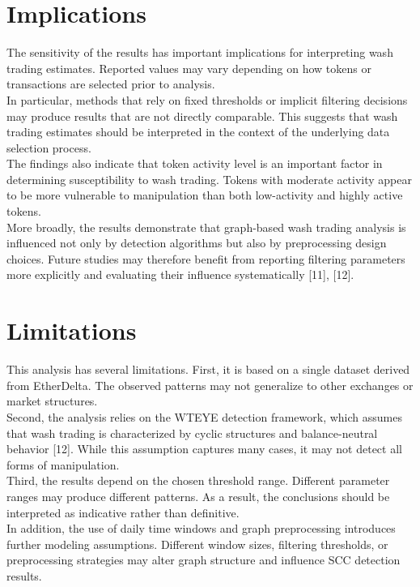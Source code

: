 \documentclass[language=english,thesis=bachelor,nosecondtitle,faculty=cb,onesided,12pt]{hsmw-thesis}
\begin{document}
	\section{Implications}
The sensitivity of the results has important implications for interpreting wash trading estimates. Reported values may vary depending on how tokens or transactions are selected prior to analysis.\\
In particular, methods that rely on fixed thresholds or implicit filtering decisions may produce results that are not directly comparable. This suggests that wash trading estimates should be interpreted in the context of the underlying data selection process.\\
The findings also indicate that token activity level is an important factor in determining susceptibility to wash trading. Tokens with moderate activity appear to be more vulnerable to manipulation than both low-activity and highly active tokens.\\
More broadly, the results demonstrate that graph-based wash trading analysis is influenced not only by detection algorithms but also by preprocessing design choices. Future studies may therefore benefit from reporting filtering parameters more explicitly and evaluating their influence systematically [11], [12].
	\section{Limitations}
This analysis has several limitations. First, it is based on a single dataset derived from EtherDelta. The observed patterns may not generalize to other exchanges or market structures.\\
Second, the analysis relies on the WTEYE detection framework, which assumes that wash trading is characterized by cyclic structures and balance-neutral behavior [12]. While this assumption captures many cases, it may not detect all forms of manipulation.\\
Third, the results depend on the chosen threshold range. Different parameter ranges may produce different patterns. As a result, the conclusions should be interpreted as indicative rather than definitive.\\
In addition, the use of daily time windows and graph preprocessing introduces further modeling assumptions. Different window sizes, filtering thresholds, or preprocessing strategies may alter graph structure and influence SCC detection results.
\end{document}
